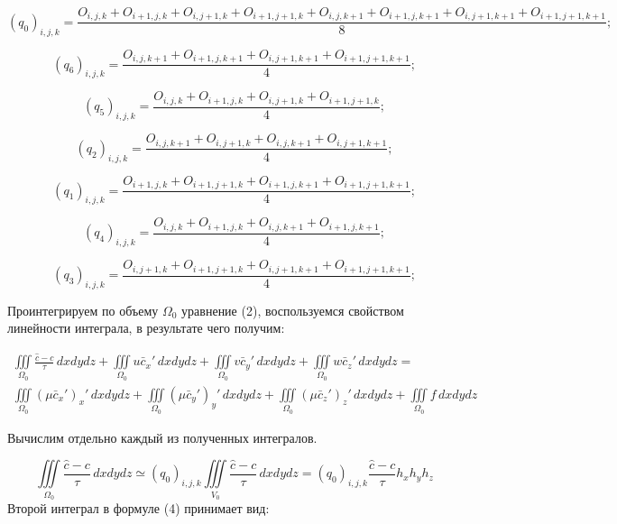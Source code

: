 \documentclass[12pt]{article}
\begin{document}
\begin{equation*}
(q_0)_{i,j,k}=\frac{O_{i,j,k}+O_{i+1,j,k}+O_{i,j+1,k}+O_{i+1,j+1,k}+O_{i,j,k+1}+O_{i+1,j,k+1}+O_{i,j+1,k+1}+O_{i+1,j+1,k+1}}{8};
\end{equation*}

\begin{equation*}
 (q_6)_{i,j,k}=\frac{O_{i,j,k+1}+O_{i+1,j,k+1}+O_{i,j+1,k+1}+O_{i+1,j+1,k+1}}{4};
\end{equation*}

\begin{equation*}
(q_5)_{i,j,k}=\frac{O_{i,j,k}+O_{i+1,j,k}+O_{i,j+1,k}+O_{i+1,j+1,k}}{4};
\end{equation*}

\begin{equation*}
(q_2)_{i,j,k}=\frac{O_{i,j,k+1}+O_{i,j+1,k}+O_{i,j,k+1}+O_{i,j+1,k+1}}{4};
\end{equation*}

\begin{equation*}
(q_1)_{i,j,k}=\frac{O_{i+1,j,k}+O_{i+1,j+1,k}+O_{i+1,j,k+1}+O_{i+1,j+1,k+1}}{4};
\end{equation*}

\begin{equation*}
(q_4)_{i,j,k}=\frac{O_{i,j,k}+O_{i+1,j,k}+O_{i,j,k+1}+O_{i+1,j,k+1}}{4};
\end{equation*}

\begin{equation*}
(q_3)_{i,j,k}=\frac{O_{i,j+1,k}+O_{i+1,j+1,k}+O_{i,j+1,k+1}+O_{i+1,j+1,k+1}}{4};
\end{equation*}

Проинтегрируем по объему $\Omega_0$ уравнение (2), воспользуемся свойством линейности интеграла, в результате чего получим:

\begin{multline}
\iiint\limits_{\Omega_0} \frac{\hat c - c}{\tau}\,dxdydz + \iiint\limits_{\Omega_0} u\bar{c}_x'\,dxdydz + \iiint\limits_{\Omega_0} v\bar{c}_y'\,dxdydz + \iiint\limits_{\Omega_0} w\bar{c}_z'\,dxdydz = \\
\iiint\limits_{\Omega_0} (\mu\bar{c}_x')_x'\,dxdydz + \iiint\limits_{\Omega_0} (\mu\bar{c}_y')_y'\,dxdydz + \iiint\limits_{\Omega_0} (\mu\bar{c}_z')_z'\,dxdydz + \iiint\limits_{\Omega_0} f\,dxdydz  
\end{multline}

Вычислим отдельно каждый из полученных интегралов.

\begin{equation}
	\iiint\limits_{\Omega_0} \frac{\hat c - c}{\tau}\,dxdydz \simeq (q_0)_{i,j,k}\iiint\limits_{V_0} \frac{\hat c - c}{\tau}\,dxdydz = (q_0)_{i,j,k}\frac{\hat c - c}{\tau}h_xh_yh_z
\end{equation}
Второй интеграл в формуле (4) принимает вид:
\end{document}
